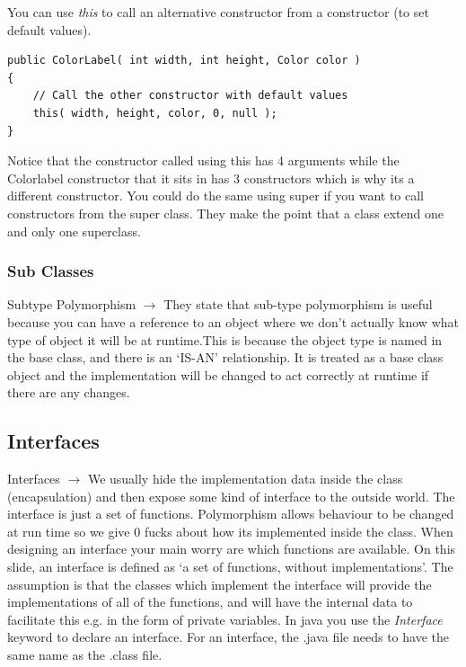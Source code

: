 \documentclass{article}
\begin{document}
You can use \emph{this} to call an alternative constructor from a constructor (to set default values).

\begin{lstlisting}
public ColorLabel( int width, int height, Color color )
{
	// Call the other constructor with default values
	this( width, height, color, 0, null );
}
\end{lstlisting}

Notice that the constructor called using this has 4 arguments while the Colorlabel constructor
that it sits in has 3 constructors which is why its a different constructor. You could do the same
using super if you want to call constructors from the super class. They make the point that a class 
extend one and only one superclass.

\subsubsection{Sub Classes}

Subtype Polymorphism $\longrightarrow$ They state that sub-type polymorphism is useful because 
you can have a reference to an object where we don't actually know what type of object it will be at
runtime.This is because the object type is named in the base class, and there is an `IS-AN' relationship.
It is treated as a base class object and the implementation will be changed to act correctly at runtime 
if there are any changes.

\subsection{Interfaces}

Interfaces $\longrightarrow$ We usually hide the implementation data inside the class (encapsulation)
	and then expose some kind of interface to the outside world. The interface is just a set of 
	functions. Polymorphism allows behaviour to be changed at run time so we give 0 fucks about
	how its implemented inside the class. When designing an interface your main worry are which
	functions are available. On this slide, an interface is defined as `a set of functions, without
	implementations'. The assumption is that the classes which implement the interface will provide
	the implementations of all of the functions, and will have the internal data to facilitate this
	e.g. in the form of private variables. In java you use the \emph{Interface} keyword to declare an 
	interface. For an interface, the .java file needs to have the same name as the .class file.
\end{document}
